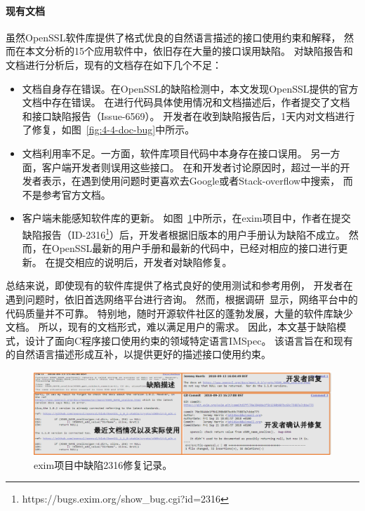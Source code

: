 \paragraph{现有文档}
虽然OpenSSL软件库提供了格式优良的自然语言描述的接口使用约束和解释，
然而在本文分析的15个应用软件中，依旧存在大量的接口误用缺陷。
对缺陷报告和文档进行分析后，现有的文档存在如下几个不足：
\begin{itemize}
	\item 文档自身存在错误。在OpenSSL的缺陷检测中，本文发现OpenSSL提供的官方文档中存在错误。
	在进行代码具体使用情况和文档描述后，作者提交了文档和接口缺陷报告（Issue-6569）。
	开发者在收到缺陷报告后，1天内对文档进行了修复，如图~\ref{fig:4-4-doc-bug}中所示。
	\item 文档利用率不足。一方面，软件库项目代码中本身存在接口误用。
	另一方面，客户端开发者则误用这些接口。
	在和开发者讨论原因时，超过一半的开发者表示，在遇到使用问题时更喜欢去Google或者Stack-overflow中搜索，
	而不是参考官方文档。
	\item 客户端未能感知软件库的更新。
	如图~\ref{fig:4-4-exim-bug}中所示，在exim项目中，作者在提交缺陷报告（ID-2316\footnote{https://bugs.exim.org/show\_bug.cgi?id=2316}）后，开发者根据旧版本的用户手册认为缺陷不成立。
	然而，在OpenSSL最新的用户手册和最新的代码中，已经对相应的接口进行更新。
	在提交相应的说明后，开发者对缺陷修复。
\end{itemize}

总结来说，即使现有的软件库提供了格式良好的使用测试和参考用例，
开发者在遇到问题时，依旧首选网络平台进行咨询。
然而，根据调研~\cite{18-icse-stack}显示，网络平台中的代码质量并不可靠。
特别地，随时开源软件社区的蓬勃发展，大量的软件库缺少文档。
所以，现有的文档形式，难以满足用户的需求。
因此，本文基于缺陷模式，设计了面向C程序接口使用约束的领域特定语言IMSpec。
该语言旨在和现有的自然语言描述形成互补，以提供更好的描述接口使用约束。

\begin{figure}[b]
	\centering
	\includegraphics[width=\linewidth]{figures/cp4-exim-bug.png}
	\caption{
		exim项目中缺陷2316修复记录。
	}
	\label{fig:4-4-exim-bug}
\end{figure}

